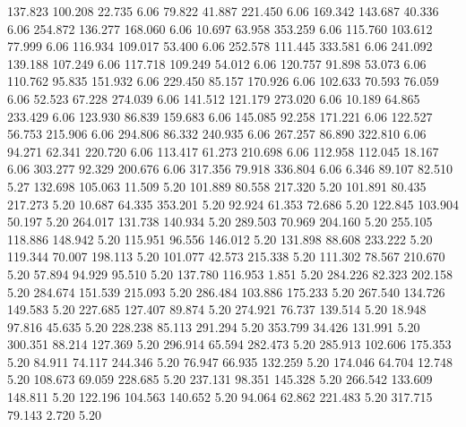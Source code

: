  137.823  100.208   22.735         6.06
  79.822   41.887  221.450         6.06
 169.342  143.687   40.336         6.06
 254.872  136.277  168.060         6.06
  10.697   63.958  353.259         6.06
 115.760  103.612   77.999         6.06
 116.934  109.017   53.400         6.06
 252.578  111.445  333.581         6.06
 241.092  139.188  107.249         6.06
 117.718  109.249   54.012         6.06
 120.757   91.898   53.073         6.06
 110.762   95.835  151.932         6.06
 229.450   85.157  170.926         6.06
 102.633   70.593   76.059         6.06
  52.523   67.228  274.039         6.06
 141.512  121.179  273.020         6.06
  10.189   64.865  233.429         6.06
 123.930   86.839  159.683         6.06
 145.085   92.258  171.221         6.06
 122.527   56.753  215.906         6.06
 294.806   86.332  240.935         6.06
 267.257   86.890  322.810         6.06
  94.271   62.341  220.720         6.06
 113.417   61.273  210.698         6.06
 112.958  112.045   18.167         6.06
 303.277   92.329  200.676         6.06
 317.356   79.918  336.804         6.06
   6.346   89.107   82.510         5.27
 132.698  105.063   11.509         5.20
 101.889   80.558  217.320         5.20
 101.891   80.435  217.273         5.20
  10.687   64.335  353.201         5.20
  92.924   61.353   72.686         5.20
 122.845  103.904   50.197         5.20
 264.017  131.738  140.934         5.20
 289.503   70.969  204.160         5.20
 255.105  118.886  148.942         5.20
 115.951   96.556  146.012         5.20
 131.898   88.608  233.222         5.20
 119.344   70.007  198.113         5.20
 101.077   42.573  215.338         5.20
 111.302   78.567  210.670         5.20
  57.894   94.929   95.510         5.20
 137.780  116.953    1.851         5.20
 284.226   82.323  202.158         5.20
 284.674  151.539  215.093         5.20
 286.484  103.886  175.233         5.20
 267.540  134.726  149.583         5.20
 227.685  127.407   89.874         5.20
 274.921   76.737  139.514         5.20
  18.948   97.816   45.635         5.20
 228.238   85.113  291.294         5.20
 353.799   34.426  131.991         5.20
 300.351   88.214  127.369         5.20
 296.914   65.594  282.473         5.20
 285.913  102.606  175.353         5.20
  84.911   74.117  244.346         5.20
  76.947   66.935  132.259         5.20
 174.046   64.704   12.748         5.20
 108.673   69.059  228.685         5.20
 237.131   98.351  145.328         5.20
 266.542  133.609  148.811         5.20
 122.196  104.563  140.652         5.20
  94.064   62.862  221.483         5.20
 317.715   79.143    2.720         5.20
